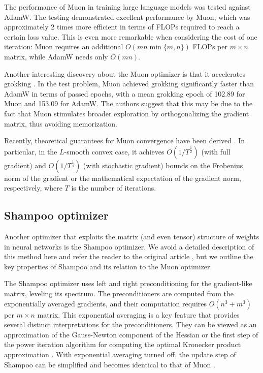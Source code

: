 \documentclass[]{scrartcl}
\begin{document}
The performance of Muon in training large language models was tested \cite{liu2025muon} against AdamW. The testing demonstrated excellent performance by Muon, which was approximately 2 times more efficient in terms of FLOPs required to reach a certain loss value. This is even more remarkable when considering the cost of one iteration: Muon requires an additional $O(mn \min\{m, n\})$ FLOPs per $m \times n$ matrix, while AdamW needs only $O(mn)$.

Another interesting discovery about the Muon optimizer is that it accelerates grokking \cite{tveit2025muonoptimizeracceleratesgrokking}. In the test problem, Muon achieved grokking significantly faster than AdamW in terms of passed epochs, with a mean grokking epoch of 102.89 for Muon and 153.09 for AdamW. The authors suggest that this may be due to the fact that Muon stimulates broader exploration by orthogonalizing the gradient matrix, thus avoiding memorization.

Recently, theoretical guarantees for Muon convergence have been derived \cite{li2025noteconvergencemuon}. In particular, in the $L$-smooth convex case, it achieves $O(1/T^{\frac{1}{2}})$ (with full gradient) and $O(1/T^{\frac{1}{4}})$ (with stochastic gradient) bounds on the Frobenius norm of the gradient or the mathematical expectation of the gradient norm, respectively, where $T$ is the number of iterations.

\subsection{Shampoo optimizer}

Another optimizer that exploits the matrix (and even tensor) structure of weights in neural networks is the Shampoo optimizer. We avoid a detailed description of this method here and refer the reader to the original article \cite{gupta2018shampoopreconditionedstochastictensor}, but we outline the key properties of Shampoo and its relation to the Muon optimizer.

The Shampoo optimizer uses left and right preconditioning for the gradient-like matrix, leveling its spectrum. The preconditioners are computed from the exponentially averaged gradients, and their computation requires $O(n^3 + m^3)$ per $m \times n$ matrix. This exponential averaging is a key feature that provides several distinct interpretations for the preconditioners. They can be viewed as an approximation of the Gauss-Newton component of the Hessian or the first step of the power iteration algorithm for computing the optimal Kronecker product approximation \cite{morwani2025a}. With exponential averaging turned off, the update step of Shampoo can be simplified and becomes identical to that of Muon \cite{jordan2024muon}.
\end{document}
